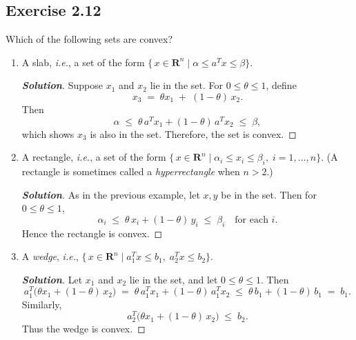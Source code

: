 \documentclass[12pt]{article}
\newenvironment{Solution}
  {\begin{proof}[\textbf{Solution}]}
  {\end{proof}}
\begin{document}
\subsection*{Exercise 2.12}
Which of the following sets are convex?
\begin{enumerate}[label=(\alph*)]

	\item
	      A slab, \emph{i.e.}, a set of the form
	      \(\{\,x \in \mathbf{R}^n \mid \alpha \leq a^T x \leq \beta\}\).
	      \begin{Solution}
		      Suppose \(x_1\) and \(x_2\) lie in the set. For \(0 \leq \theta \leq 1\), define
		      \[
			      x_3 \;=\; \theta x_1 \;+\; (1-\theta)\,x_2.
		      \]
		      Then
		      \[
			      \alpha
			      \;\le\;
			      \theta\,a^T x_1 + (1-\theta)\,a^T x_2
			      \;\le\;
			      \beta,
		      \]
		      which shows \(x_3\) is also in the set. Therefore, the set is convex.
	      \end{Solution}

	\item
	      A rectangle, \emph{i.e.}, a set of the form
	      \(\{\,x \in \mathbf{R}^n \mid \alpha_i \leq x_i \leq \beta_i,\; i=1,\dots,n\}\).
	      (A rectangle is sometimes called a \emph{hyperrectangle} when \(n>2\).)
	      \begin{Solution}
		      As in the previous example, let \(x,y\) be in the set. Then for \(0 \le \theta \le 1\),
		      \[
			      \alpha_i
			      \;\le\;
			      \theta\,x_i + (1-\theta)\,y_i
			      \;\le\;
			      \beta_i
			      \quad
			      \text{for each }i.
		      \]
		      Hence the rectangle is convex.
	      \end{Solution}

	\item
	      A \emph{wedge}, \emph{i.e.},
	      \(\{\,x \in \mathbf{R}^n \mid a_1^T x \le b_1,\; a_2^T x \le b_2\}\).
	      \begin{Solution}
		      Let \(x_1\) and \(x_2\) lie in the set, and let \(0 \le \theta \le 1\). Then
		      \[
			      a_1^T \bigl(\theta x_1 + (1-\theta)\,x_2\bigr)
			      \;=\;
			      \theta\,a_1^T x_1 + (1-\theta)\,a_1^T x_2
			      \;\le\;
			      \theta\,b_1 + (1-\theta)\,b_1
			      \;=\;
			      b_1.
		      \]
		      Similarly,
		      \[
			      a_2^T \bigl(\theta x_1 + (1-\theta)\,x_2\bigr)
			      \;\le\;
			      b_2.
		      \]
		      Thus the wedge is convex.
	      \end{Solution}


\end{enumerate}
\end{document}
